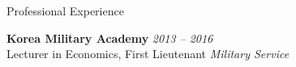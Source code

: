
\begin{rSection}{Professional Experience}

{\bf Korea Military Academy} \hfill {\em 2013 -- 2016} \\[5pt] 
Lecturer in Economics, First Lieutenant \hfill {\em Military Service}


\end{rSection}